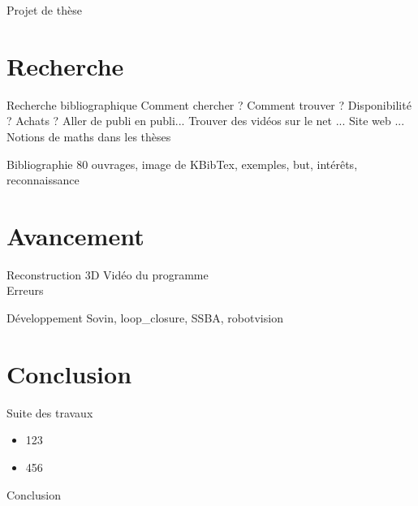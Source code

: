 \documentclass{beamer}
\begin{document}
\begin{frame}{Projet de thèse}

\end{frame}

\section{Recherche}
\begin{frame}{Recherche bibliographique}
Comment chercher ?
Comment trouver ?
Disponibilité ?
Achats ?
Aller de publi en publi...
Trouver des vidéos sur le net ...
Site web ...
Notions de maths dans les thèses
\end{frame}

\begin{frame}{Bibliographie}
80 ouvrages, image de KBibTex, exemples, but, intérêts, reconnaissance
\end{frame}

\section{Avancement}
\begin{frame}{Reconstruction 3D}
Vidéo du programme\\
Erreurs
\end{frame}

\begin{frame}{Développement}
Sovin, loop\_closure, SSBA, robotvision
\end{frame}

\section{Conclusion}
\begin{frame}{Suite des travaux}
\begin{itemize}
\item 123
\item 456
\end{itemize}
\end{frame}

\begin{frame}{Conclusion}

\end{frame}
\end{document}
